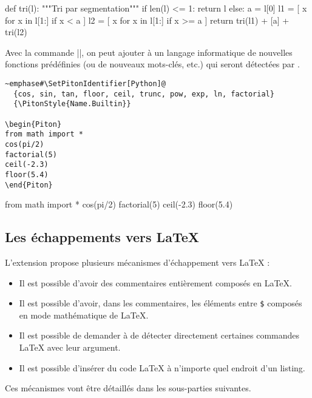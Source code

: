 \documentclass[dvipsnames,svgnames]{article}
\begin{document}
\bigskip

\begingroup


\begin{Piton}
def tri(l):
    """Tri par segmentation"""
    if len(l) <= 1:
        return l
    else:
        a = l[0]
        l1 = [ x for x in l[1:] if x < a  ]
        l2 = [ x for x in l[1:] if x >= a ]
        return tri(l1) + [a] + tri(l2)
\end{Piton}

\endgroup

\bigskip
Avec la commande |\SetPitonIdentifiers|, on peut ajouter à un langage informatique de
nouvelles fonctions prédéfinies (ou de nouveaux mots-clés, etc.) qui seront détectées par
.


\begin{Verbatim}
~emphase#\SetPitonIdentifier[Python]@
  {cos, sin, tan, floor, ceil, trunc, pow, exp, ln, factorial}
  {\PitonStyle{Name.Builtin}}

\begin{Piton}
from math import *
cos(pi/2) 
factorial(5)
ceil(-2.3) 
floor(5.4) 
\end{Piton}
\end{Verbatim}

\begingroup

  {}
 
\begin{Piton}
from math import *
cos(pi/2) 
factorial(5)
ceil(-2.3) 
floor(5.4) 
\end{Piton}


\endgroup



\subsection{Les échappements vers LaTeX}

\label{LaTeX-escapes}

L'extension  propose plusieurs mécanismes d'échappement vers LaTeX :
\begin{itemize}
\item Il est possible d'avoir des commentaires entièrement composés en LaTeX.
\item Il est possible d'avoir, dans les commentaires, les éléments entre
\texttt{\$} composés en mode mathématique de LaTeX.
\item Il est possible de demander à  de détecter directement certaines
commandes LaTeX avec leur argument.
\item Il est possible d'insérer du code LaTeX à n'importe quel endroit d'un listing.
\end{itemize}
Ces mécanismes vont être détaillés dans les sous-parties suivantes.
\end{document}
